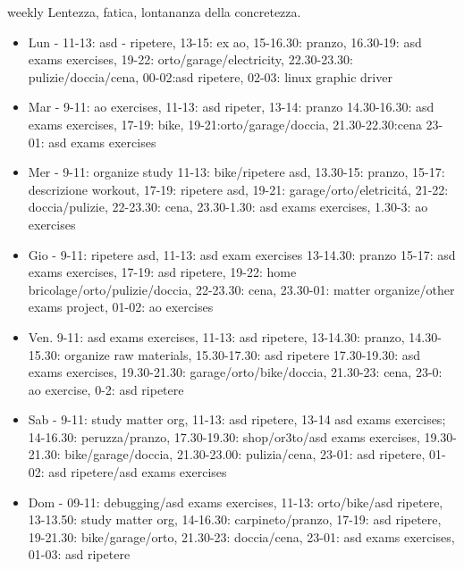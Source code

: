 \documentclass[10pt,xcolor={usenames},fleqn,mathserif,serif]{beamer}
\begin{document}
\begin{frame}[allowframebreaks]{weekly}
Lentezza, fatica, lontananza della concretezza. 
\begin{itemize}
    \item Lun - 11-13: asd - ripetere, 13-15: ex ao, 15-16.30: pranzo, 16.30-19: asd exams exercises, 19-22: orto/garage/electricity, 22.30-23.30: pulizie/doccia/cena, 00-02:asd ripetere, 02-03: linux graphic driver
    \item Mar - 9-11: ao exercises, 11-13: asd ripeter, 13-14: pranzo 14.30-16.30: asd exams exercises, 17-19: bike, 19-21:orto/garage/doccia, 21.30-22.30:cena 23-01: asd exams exercises
    \item Mer - 9-11: organize study 11-13: bike/ripetere asd, 13.30-15: pranzo, 15-17: descrizione workout, 17-19: ripetere asd, 19-21: garage/orto/eletricit\'a, 21-22: doccia/pulizie, 22-23.30: cena, 23.30-1.30: asd exams exercises, 1.30-3: ao exercises
    \item Gio - 9-11: ripetere asd, 11-13: asd exam exercises 13-14.30: pranzo 15-17: asd exams exercises, 17-19: asd ripetere, 19-22: home bricolage/orto/pulizie/doccia, 22-23.30: cena, 23.30-01: matter organize/other exams project, 01-02: ao exercises
    \item Ven. 9-11: asd exams exercises, 11-13: asd ripetere, 13-14.30: pranzo, 14.30-15.30: organize raw materials, 15.30-17.30: asd ripetere 17.30-19.30: asd exams exercises, 19.30-21.30: garage/orto/bike/doccia, 21.30-23: cena, 23-0: ao exercise, 0-2: asd ripetere
    \item Sab - 9-11: study matter org, 11-13: asd ripetere, 13-14 asd exams exercises; 14-16.30: peruzza/pranzo, 17.30-19.30: shop/or3to/asd exams exercises, 19.30-21.30: bike/garage/doccia, 21.30-23.00: pulizia/cena, 23-01: asd ripetere, 01-02: asd ripetere/asd exams exercises
    \item Dom - 09-11: debugging/asd exams exercises, 11-13: orto/bike/asd ripetere, 13-13.50: study matter org, 14-16.30: carpineto/pranzo, 17-19: asd ripetere, 19-21.30: bike/garage/orto, 21.30-23: doccia/cena,  23-01: asd exams exercises, 01-03: asd ripetere
\end{itemize}
\end{frame}
\end{document}
